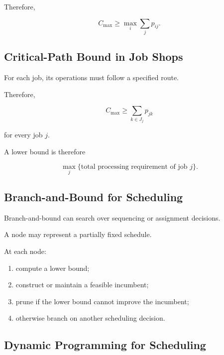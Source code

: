 Therefore,

\[
\boxed{
C_{\max}
\geq
\max_i
\sum_jp_{ij}.
}
\]

\subsection{Critical-Path Bound in Job Shops}
\label{subsec:job-shop-critical-path-bound}

For each job, its operations must follow a specified route.

Therefore,

\[
\boxed{
C_{\max}
\geq
\sum_{k\in J_j}
p_{jk}
}
\]

for every job \(j\).

A lower bound is therefore

\[
\boxed{
\max_j
\{
\text{total processing requirement of job }j
\}.
}
\]

\subsection{Branch-and-Bound for Scheduling}
\label{subsec:scheduling-branch-bound}

Branch-and-bound can search over sequencing or assignment decisions.

A node may represent a partially fixed schedule.

At each node:

\begin{enumerate}
    \item compute a lower bound;
    \item construct or maintain a feasible incumbent;
    \item prune if the lower bound cannot improve the incumbent;
    \item otherwise branch on another scheduling decision.
\end{enumerate}

\subsection{Dynamic Programming for Scheduling}
\label{subsec:scheduling-dynamic-programming}

